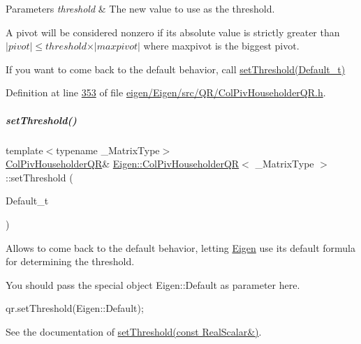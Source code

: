 \begin{DoxyParams}{Parameters}
{\em threshold} & The new value to use as the threshold.\\
\hline
\end{DoxyParams}
A pivot will be considered nonzero if its absolute value is strictly greater than $ \vert pivot \vert \leqslant threshold \times \vert maxpivot \vert $ where maxpivot is the biggest pivot.

If you want to come back to the default behavior, call \hyperlink{group___q_r___module_a648df14c457ceceb09d933d06d3bdded}{set\+Threshold(\+Default\+\_\+t)} 

Definition at line \hyperlink{eigen_2_eigen_2src_2_q_r_2_col_piv_householder_q_r_8h_source_l00353}{353} of file \hyperlink{eigen_2_eigen_2src_2_q_r_2_col_piv_householder_q_r_8h_source}{eigen/\+Eigen/src/\+Q\+R/\+Col\+Piv\+Householder\+Q\+R.\+h}.

\mbox{\label{group___q_r___module_a648df14c457ceceb09d933d06d3bdded}} 
\subparagraph{\texorpdfstring{set\+Threshold()}{setThreshold()}\hspace{0.1cm}{\footnotesize\ttfamily [3/4]}}
{\footnotesize\ttfamily template$<$typename \+\_\+\+Matrix\+Type$>$ \\
\hyperlink{group___q_r___module_class_eigen_1_1_col_piv_householder_q_r}{Col\+Piv\+Householder\+QR}\& \hyperlink{group___q_r___module_class_eigen_1_1_col_piv_householder_q_r}{Eigen\+::\+Col\+Piv\+Householder\+QR}$<$ \+\_\+\+Matrix\+Type $>$\+::set\+Threshold (\begin{DoxyParamCaption}\item[{Default\+\_\+t}]{ }\end{DoxyParamCaption})\hspace{0.3cm}{\ttfamily [inline]}}

Allows to come back to the default behavior, letting \hyperlink{namespace_eigen}{Eigen} use its default formula for determining the threshold.

You should pass the special object Eigen\+::\+Default as parameter here. 
\begin{DoxyCode}
qr.setThreshold(Eigen::Default); 
\end{DoxyCode}


See the documentation of \hyperlink{group___q_r___module_ae712cdc9f0e521cfc8061bee58ff55ee}{set\+Threshold(const Real\+Scalar\&)}. 

